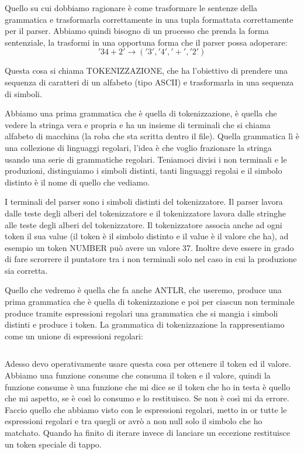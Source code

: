 Quello su cui dobbiamo ragionare è come trasformare le sentenze della grammatica e trasformarla correttamente in una tupla formattata correttamente per il parser. Abbiamo quindi bisogno di un processo che prenda la forma sentenziale, la trasformi in una opportuna forma che il parser possa adoperare:
\[
'34 + 2' \rightarrow ('3', '4', '+', '2')
\]

Questa cosa si chiama TOKENIZZAZIONE, che ha l'obiettivo di prendere una sequenza di caratteri di un alfabeto (tipo ASCII) e trasformarla in una sequenza di simboli.

Abbiamo una prima grammatica che è quella di tokenizzazione, è quella che vedere la stringa vera e propria e ha un insieme di terminali che si chiama alfabeto di macchina (la roba che sta scritta dentro il file). Quella grammatica lì è una collezione di linguaggi regolari, l'idea è che voglio frazionare la stringa usando una serie di grammatiche regolari.
Teniamoci divisi i non terminali e le produzioni, distinguiamo i simboli distinti, tanti linguaggi regolai e il simbolo distinto è il nome di quello che vediamo.

I terminali del parser sono i simboli distinti del tokenizzatore. Il parser lavora dalle teste degli alberi del tokenizzatore e il tokenizzatore lavora dalle stringhe alle teste degli alberi del tokenizzatore.
Il tokenizzatore associa anche ad ogni token il sua value (il token è il simbolo distinto e il value è il valore che ha), ad esempio un token NUMBER può avere un valore 37. Inoltre deve essere in grado di fare scrorrere il puntatore tra i non terminali solo nel caso in cui la produzione sia corretta.

Quello che vedremo è quella che fa anche ANTLR, che useremo, produce una prima grammatica che è quella di tokenizzazione e poi per ciascun non terminale produce tramite espressioni regolari una grammatica che si mangia i simboli distinti e produce i token.
La grammatica di tokenizzazione la rappresentiamo come un unione di espressioni regolari:
\begin{lstlisting}

\end{lstlisting}

Adesso devo operativamente usare questa cosa per ottenere il token ed il valore.
Abbiamo una funzione consume che consuma il token e il valore, quindi la funzione consume è una funzione che mi dice se il token che ho in testa è quello che mi aspetto, se è così lo consumo e lo restituisco. Se non è così mi da errore. Faccio quello che abbiamo visto con le espressioni regolari, metto in or tutte le espressioni regolari e tra quegli or avrò a non null solo il simbolo che ho matchato. Quando ha finito di iterare invece di lanciare un eccezione restituisce un token speciale di tappo.
\begin{lstlisting}

\end{lstlisting}

